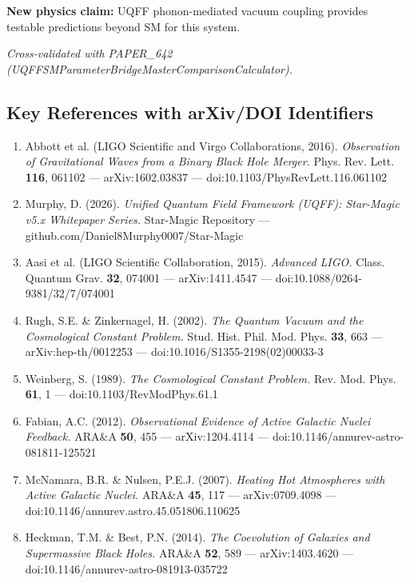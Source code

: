 \documentclass[12pt,a4paper]{article}
\begin{document}
\textbf{New physics claim:} UQFF phonon-mediated vacuum coupling provides testable predictions beyond SM for this system.

\emph{Cross-validated with PAPER\_642 (UQFFSMParameterBridgeMasterComparisonCalculator).}

\subsection{Key References with arXiv/DOI Identifiers}

\begin{enumerate}
  \item Abbott et al. (LIGO Scientific and Virgo Collaborations, 2016). \emph{Observation of Gravitational Waves from a Binary Black Hole Merger.} Phys. Rev. Lett. \textbf{116}, 061102 --- arXiv:1602.03837 --- doi:10.1103/PhysRevLett.116.061102
  \item Murphy, D. (2026). \emph{Unified Quantum Field Framework (UQFF): Star-Magic v5.x Whitepaper Series.} Star-Magic Repository --- github.com/Daniel8Murphy0007/Star-Magic
  \item Aasi et al. (LIGO Scientific Collaboration, 2015). \emph{Advanced LIGO.} Class. Quantum Grav. \textbf{32}, 074001 --- arXiv:1411.4547 --- doi:10.1088/0264-9381/32/7/074001
  \item Rugh, S.E. \& Zinkernagel, H. (2002). \emph{The Quantum Vacuum and the Cosmological Constant Problem.} Stud. Hist. Phil. Mod. Phys. \textbf{33}, 663 --- arXiv:hep-th/0012253 --- doi:10.1016/S1355-2198(02)00033-3
  \item Weinberg, S. (1989). \emph{The Cosmological Constant Problem.} Rev. Mod. Phys. \textbf{61}, 1 --- doi:10.1103/RevModPhys.61.1
  \item Fabian, A.C. (2012). \emph{Observational Evidence of Active Galactic Nuclei Feedback.} ARA\&A \textbf{50}, 455 --- arXiv:1204.4114 --- doi:10.1146/annurev-astro-081811-125521
  \item McNamara, B.R. \& Nulsen, P.E.J. (2007). \emph{Heating Hot Atmospheres with Active Galactic Nuclei.} ARA\&A \textbf{45}, 117 --- arXiv:0709.4098 --- doi:10.1146/annurev.astro.45.051806.110625
  \item Heckman, T.M. \& Best, P.N. (2014). \emph{The Coevolution of Galaxies and Supermassive Black Holes.} ARA\&A \textbf{52}, 589 --- arXiv:1403.4620 --- doi:10.1146/annurev-astro-081913-035722
\end{enumerate}
\end{document}
